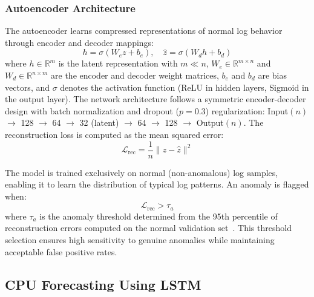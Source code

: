 \documentclass[a4paper,fleqn]{cas-dc}
\begin{document}
\subsubsection{Autoencoder Architecture}
The autoencoder learns compressed representations of normal log behavior through encoder and decoder mappings:
\begin{equation}
h = \sigma(W_e z + b_e), \quad \hat{z} = \sigma(W_d h + b_d)
\end{equation}
where $h \in \mathbb{R}^m$ is the latent representation with $m \ll n$, $W_e \in \mathbb{R}^{m \times n}$ and $W_d \in \mathbb{R}^{n \times m}$ are the encoder and decoder weight matrices, $b_e$ and $b_d$ are bias vectors, and $\sigma$ denotes the activation function (ReLU in hidden layers, Sigmoid in the output layer).
The network architecture follows a symmetric encoder-decoder design with batch normalization and dropout ($p=0.3$) regularization: Input$(n)$ $\rightarrow$ 128 $\rightarrow$ 64 $\rightarrow$ 32 (latent) $\rightarrow$ 64 $\rightarrow$ 128 $\rightarrow$ Output$(n)$.
The reconstruction loss is computed as the mean squared error:
\begin{equation}
\mathcal{L}_{\mathrm{rec}} = \frac{1}{n}\|z - \hat{z}\|^2
\end{equation}

The model is trained exclusively on normal (non-anomalous) log samples, enabling it to learn the distribution of typical log patterns.
An anomaly is flagged when:
\begin{equation}
\mathcal{L}_{\mathrm{rec}} > \tau_a
\end{equation}
where $\tau_a$ is the anomaly threshold determined from the 95th percentile of reconstruction errors computed on the normal validation set~\citep{sakurada2014anomaly}.
This threshold selection ensures high sensitivity to genuine anomalies while maintaining acceptable false positive rates.

\subsection{CPU Forecasting Using LSTM}\label{subsec:cpuforecast}
\end{document}

